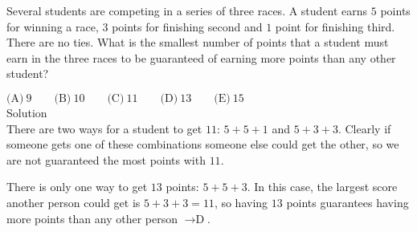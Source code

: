 

Several students are competing in a series of three races. A student earns $5$ points for winning a race, $3$ points for finishing second and $1$ point for finishing third. There are no ties. What is the smallest number of points that a student must earn in the three races to be guaranteed of earning more points than any other student?

$\text{(A)}\ 9 \qquad \text{(B)}\ 10 \qquad \text{(C)}\ 11 \qquad \text{(D)}\ 13 \qquad \text{(E)}\ 15$
\\
Solution
\\
There are two ways for a student to get $11$: $5+5+1$ and $5+3+3$. Clearly if someone gets one of these combinations someone else could get the other, so we are not guaranteed the most points with $11$.

There is only one way to get $13$ points: $5+5+3$. In this case, the largest score another person could get is $5+3+3=11$, so having $13$ points guarantees having more points than any other person $\rightarrow \boxed{\text{D}}$.
